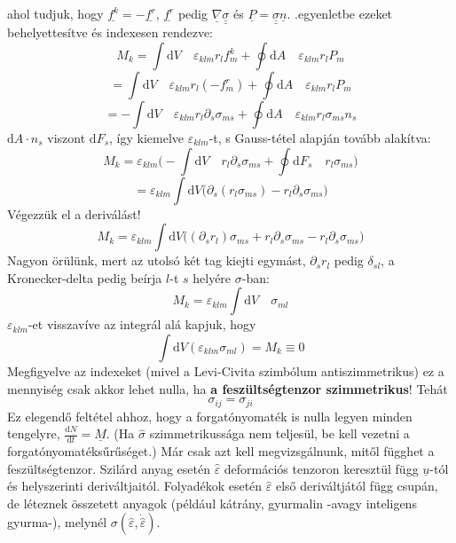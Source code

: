 \documentclass[a4paper, 12pt, titlepage]{article}
\begin{document}
ahol tudjuk, hogy $\underline{f^{k}}=-\underline{f^{r}}$, $\underline{f^{r}}$ pedig $\underline{\nabla}\underline{\underline{\sigma}}$ és $\underline{P}=\underline{\underline{\sigma}}\underline{n}$. .\hspace{1mm}egyenletbe ezeket behelyettesítve és indexesen rendezve:
\[M_{k}=\int\mathrm{d}V\quad\varepsilon_{klm}r_{l}f^{k}_{m}+\oint\mathrm{d}A\quad\varepsilon_{klm}r_{l}P_{m}\]
\[=\int\mathrm{d}V\quad\varepsilon_{klm}r_{l}(-f^{r}_{m})+\oint\mathrm{d}A\quad\varepsilon_{klm}r_{l}P_{m}\]
\[=-\int\mathrm{d}V\quad\varepsilon_{klm}r_{l}\partial_{s}\sigma_{ms}+\oint\mathrm{d}A\quad\varepsilon_{klm}r_{l}\sigma_{ms}n_{s}\]
$\mathrm{d}A\cdot n_{s}$ viszont $\mathrm{d}F_{s}$, így kiemelve $\varepsilon_{klm}$-t, s Gauss-tétel alapján tovább alakítva:
\[M_{k}=\varepsilon_{klm}\Bigg(-\int\mathrm{d}V\quad r_{l}\partial_{s}\sigma_{ms}+\oint\mathrm{d}F_{s}\quad r_{l}\sigma_{ms}\Bigg)\]
\[=\varepsilon_{klm}\int\mathrm{d}V\bigg(\partial_{s}(r_{l}\sigma_{ms})-r_{l}\partial_{s}\sigma_{ms}\bigg)\]
Végezzük el a deriválást!
\[M_{k}=\varepsilon_{klm}\int\mathrm{d}V\bigg((\partial_{s}r_{l})\sigma_{ms}+r_{l}\partial_{s}\sigma_{ms}-r_{l}\partial_{s}\sigma_{ms}\bigg)\]
Nagyon örülünk, mert az utolsó két tag kiejti egymást, $\partial_{s}r_{l}$ pedig $\delta_{sl}$, a Kronecker-delta pedig beírja $l$-t $s$ helyére $\sigma$-ban:
\[M_{k}=\varepsilon_{klm}\int\mathrm{d}V\quad\sigma_{ml}\]
$\varepsilon_{klm}$-et visszavíve az integrál alá kapjuk, hogy
\[\int\mathrm{d}V(\varepsilon_{klm}\sigma_{ml})=M_{k}\equiv 0\]
Megfigyelve az indexeket (mivel a Levi-Civita szimbólum antiszimmetrikus) ez a mennyiség csak akkor lehet nulla, ha \textbf{a feszültségtenzor szimmetrikus}! Tehát
	\begin{equation}
\sigma_{ij}=\sigma_{ji}
	\label{eq:szimm}
	\end{equation}
Ez elegendő feltétel ahhoz, hogy a forgatónyomaték is nulla legyen minden tengelyre, $\frac{\mathrm{d}\underline{N}}{\mathrm{d}t}=\underline{M}$. (Ha $\hat{\sigma}$ szimmetrikussága nem teljesül, be kell vezetni a forgatónyomatéksűrűséget.)
\newline
Már csak azt kell megvizsgálnunk, mitől függhet a feszültségtenzor. Szilárd anyag esetén $\hat{\varepsilon}$ deformációs tenzoron keresztül függ $\underline{u}$-tól és helyszerinti deriváltjaitól. Folyadékok esetén $\hat{\varepsilon}$ első deriváltjától függ csupán, de léteznek összetett anyagok (például kátrány, gyurmalin -avagy inteligens gyurma-), melynél $\sigma(\hat{\varepsilon},\dot{\hat{\varepsilon}})$.



\end{document}
